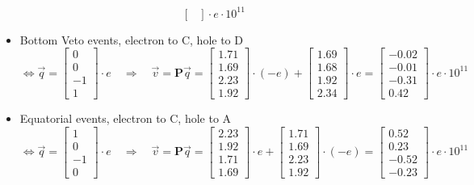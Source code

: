 \begin{itemize}
\begin{equation}
\begin{bmatrix}
	\end{bmatrix}
	\cdot e \cdot 10^{11}
	\end{equation}
	\item Bottom Veto events, electron to C, hole to D \begin{equation}
	\Leftrightarrow \vec{q} =
	\begin{bmatrix}
	0 \\ 0 \\ -1 \\ 1
	\end{bmatrix}
	\cdot e
	\quad \Rightarrow \quad
	\vec{v} = \bm{P} \vec{q} =
	\begin{bmatrix}
	1.71 \\ 1.69 \\ 2.23 \\ 1.92
	\end{bmatrix}
	\cdot (-e)
	+
	\begin{bmatrix}
	1.69 \\ 1.68 \\ 1.92 \\ 2.34
	\end{bmatrix}
	\cdot e
	= 
	\begin{bmatrix}
	-0.02 \\ -0.01 \\ -0.31 \\ 0.42
	\end{bmatrix}
	\cdot e \cdot 10^{11}
	\end{equation}
	\item Equatorial events, electron to C, hole to A \begin{equation}
	\Leftrightarrow \vec{q} =
	\begin{bmatrix}
	1 \\ 0 \\ -1 \\ 0
	\end{bmatrix}
	\cdot e
	\quad \Rightarrow \quad
	\vec{v} = \bm{P} \vec{q} =
	\begin{bmatrix}
	2.23 \\ 1.92 \\ 1.71 \\ 1.69
	\end{bmatrix}
	\cdot e
	+	
	\begin{bmatrix}
	1.71 \\ 1.69 \\ 2.23 \\ 1.92
	\end{bmatrix}
	\cdot (-e)
	= 
	\begin{bmatrix}
	0.52 \\ 0.23 \\ -0.52 \\ -0.23
	\end{bmatrix}
	\cdot e \cdot 10^{11}
	\end{equation}
\end{itemize} 

